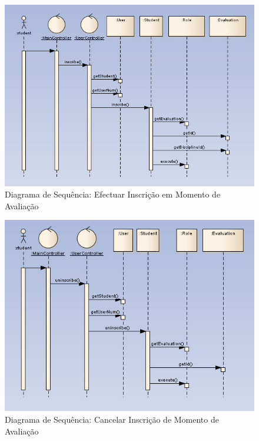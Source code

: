 \begin{figure}[!htbp]
\centering
\includegraphics[width=17cm]{imagens/inscrever_avaliacao.jpg}
\caption{Diagrama de Sequência: Efectuar Inscrição em Momento de Avaliação}
\label{fig:inscrever_avaliacao}
\end{figure}

\begin{figure}[!htbp]
\centering
\includegraphics[width=17cm]{imagens/cancelar_inscricao.jpg}
\caption{Diagrama de Sequência: Cancelar Inscrição de Momento de Avaliação}
\label{fig:cancelar_inscricao}
\end{figure}





